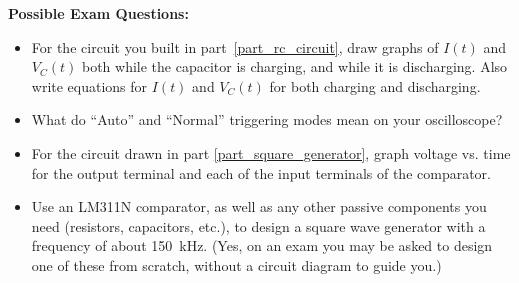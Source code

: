 \textbf{Possible Exam Questions:}

\begin{itemize}


\item For the circuit you built in part~\ref{part_rc_circuit}, draw graphs of $I(t)$ and $V_C(t)$ both while the capacitor is charging, and while it is discharging.  Also write equations for $I(t)$ and $V_C(t)$ for both charging and discharging.

\item What do ``Auto'' and ``Normal'' triggering modes mean on your oscilloscope?

\item For the circuit drawn in part \ref{part_square_generator}, graph voltage vs. time for the output terminal and each of the input terminals of the comparator.


\item Use an LM311N comparator, as well as any other passive components you need (resistors, capacitors, etc.), to design a square wave generator with a frequency of about 150~kHz.  (Yes, on an exam you may be asked to design one of these from scratch, without a circuit diagram to guide you.)

\end{itemize}






\